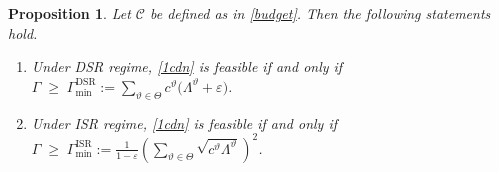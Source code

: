 \documentclass[a4paper,11pt,reqno]{amsart}
\newtheorem{proposition}{Proposition}
\begin{document}
\begin{proposition}\label{prop:budget_feasibility}
Let $\mathcal C$ be defined as in \eqref{budget}. Then the following statements hold.

\begin{enumerate}[label=\roman*), ref=\roman*]
\item Under {\rm DSR} regime, \eqref{1cdn} is feasible if and only if $
\Gamma \;\ge\;
\Gamma_{\min}^{\mathrm{DSR}}
:=
\sum_{\vartheta\in \Theta} c^\vartheta \big(\Lambda^\vartheta+\varepsilon\big)$.

\item Under {\rm ISR} regime, \eqref{1cdn} is feasible if and only if $
\Gamma \;\ge\;
\Gamma_{\min}^{\mathrm{ISR}}
:= \frac{1}{1-\varepsilon} \left(\sum_{\vartheta\in \Theta} \sqrt{c^\vartheta \Lambda^\vartheta}\right)^2$.
\end{enumerate}
\end{proposition}
\end{document}
